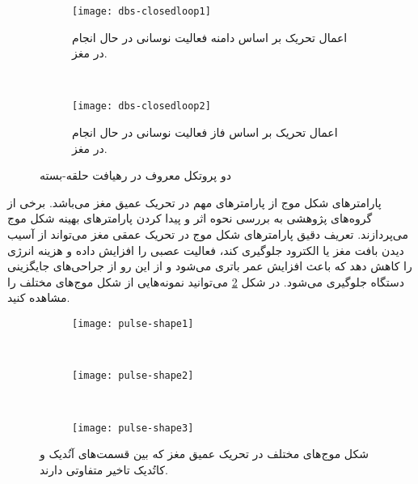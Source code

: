 \begin{figure}[t!]
     \centering
     \begin{subfigure}[t]{0.45\textwidth}
         \centering
         \texttt{[image: dbs-closedloop1]}
         \caption{
 اعمال تحریک بر اساس دامنه فعالیت نوسانی در حال انجام در مغز.
         }
     \end{subfigure}
     \
     \begin{subfigure}[t]{0.45\textwidth}
         \centering
         \texttt{[image: dbs-closedloop2]}
         \caption{
 اعمال تحریک بر اساس فاز فعالیت نوسانی در حال انجام در مغز.
         }
     \end{subfigure}
        \caption{
دو پروتکل معروف در رهیافت حلقه-بسته
         }
        \label{fig:dbs-closed-loop}
\end{figure}



پارامترهای شکل موج از پارامترهای مهم در تحریک عمیق مغز می‌باشد. برخی از گروه‌های پژوهشی به بررسی نحوه اثر و پیدا کردن پارامترهای بهینه شکل موج می‌پردازند. تعریف دقیق پارامترهای شکل موج در تحریک عمقی مغز می‌تواند از آسیب دیدن بافت مغز یا الکترود جلوگیری کند، فعالیت عصبی را افزایش داده و هزینه انرژی را کاهش دهد که باعث افزایش عمر باتری می‌شود و از این رو از جراحی‌های جایگزینی دستگاه جلوگیری می‌شود. در شکل 
\ref{fig:dbs-pulse-shape}
می‌توانید نمونه‌هایی از شکل موج‌های مختلف را مشاهده کنید. 


\begin{figure}[b!]
     \centering
     \begin{subfigure}[t]{0.3\textwidth}
         \centering
         \texttt{[image: pulse-shape1]}
     \end{subfigure}
     \
     \begin{subfigure}[t]{0.3\textwidth}
         \centering
         \texttt{[image: pulse-shape2]}
     \end{subfigure}
     \
     \begin{subfigure}[t]{0.3\textwidth}
         \centering
         \texttt{[image: pulse-shape3]}
     \end{subfigure}
        \caption{
شکل موج‌های مختلف در تحریک عمیق مغز که بین قسمت‌های آنُدیک و کاتُدیک تاخیر متفاوتی دارند.
         }
        \label{fig:dbs-pulse-shape}
\end{figure}



